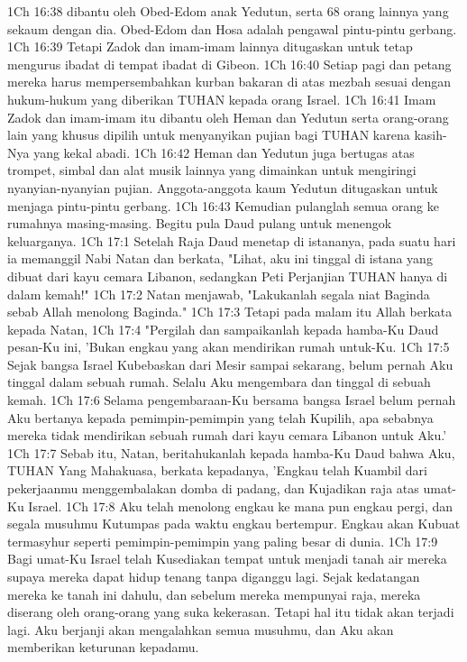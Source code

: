 1Ch 16:38  dibantu oleh Obed-Edom anak Yedutun, serta 68 orang lainnya yang sekaum dengan dia. Obed-Edom dan Hosa adalah pengawal pintu-pintu gerbang.
1Ch 16:39  Tetapi Zadok dan imam-imam lainnya ditugaskan untuk tetap mengurus ibadat di tempat ibadat di Gibeon.
1Ch 16:40  Setiap pagi dan petang mereka harus mempersembahkan kurban bakaran di atas mezbah sesuai dengan hukum-hukum yang diberikan TUHAN kepada orang Israel.
1Ch 16:41  Imam Zadok dan imam-imam itu dibantu oleh Heman dan Yedutun serta orang-orang lain yang khusus dipilih untuk menyanyikan pujian bagi TUHAN karena kasih-Nya yang kekal abadi.
1Ch 16:42  Heman dan Yedutun juga bertugas atas trompet, simbal dan alat musik lainnya yang dimainkan untuk mengiringi nyanyian-nyanyian pujian. Anggota-anggota kaum Yedutun ditugaskan untuk menjaga pintu-pintu gerbang.
1Ch 16:43  Kemudian pulanglah semua orang ke rumahnya masing-masing. Begitu pula Daud pulang untuk menengok keluarganya.
1Ch 17:1  Setelah Raja Daud menetap di istananya, pada suatu hari ia memanggil Nabi Natan dan berkata, "Lihat, aku ini tinggal di istana yang dibuat dari kayu cemara Libanon, sedangkan Peti Perjanjian TUHAN hanya di dalam kemah!"
1Ch 17:2  Natan menjawab, "Lakukanlah segala niat Baginda sebab Allah menolong Baginda."
1Ch 17:3  Tetapi pada malam itu Allah berkata kepada Natan,
1Ch 17:4  "Pergilah dan sampaikanlah kepada hamba-Ku Daud pesan-Ku ini, 'Bukan engkau yang akan mendirikan rumah untuk-Ku.
1Ch 17:5  Sejak bangsa Israel Kubebaskan dari Mesir sampai sekarang, belum pernah Aku tinggal dalam sebuah rumah. Selalu Aku mengembara dan tinggal di sebuah kemah.
1Ch 17:6  Selama pengembaraan-Ku bersama bangsa Israel belum pernah Aku bertanya kepada pemimpin-pemimpin yang telah Kupilih, apa sebabnya mereka tidak mendirikan sebuah rumah dari kayu cemara Libanon untuk Aku.'
1Ch 17:7  Sebab itu, Natan, beritahukanlah kepada hamba-Ku Daud bahwa Aku, TUHAN Yang Mahakuasa, berkata kepadanya, 'Engkau telah Kuambil dari pekerjaanmu menggembalakan domba di padang, dan Kujadikan raja atas umat-Ku Israel.
1Ch 17:8  Aku telah menolong engkau ke mana pun engkau pergi, dan segala musuhmu Kutumpas pada waktu engkau bertempur. Engkau akan Kubuat termasyhur seperti pemimpin-pemimpin yang paling besar di dunia.
1Ch 17:9  Bagi umat-Ku Israel telah Kusediakan tempat untuk menjadi tanah air mereka supaya mereka dapat hidup tenang tanpa diganggu lagi. Sejak kedatangan mereka ke tanah ini dahulu, dan sebelum mereka mempunyai raja, mereka diserang oleh orang-orang yang suka kekerasan. Tetapi hal itu tidak akan terjadi lagi. Aku berjanji akan mengalahkan semua musuhmu, dan Aku akan memberikan keturunan kepadamu.
